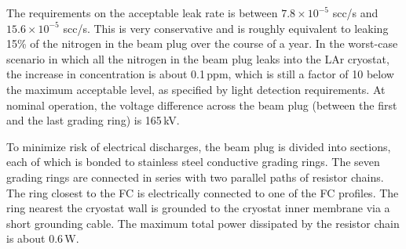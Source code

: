
The requirements on the acceptable leak rate is between $7.8\times 10^{-5}$ scc/s and $15.6\times 10^{-5}$ scc/s. This is very conservative and is roughly equivalent to leaking  15\% of the nitrogen in the beam plug over the course of a year.
  In the worst-case scenario in which all the nitrogen in the beam plug leaks into the LAr cryostat, the increase in concentration is about 0.1\,ppm, which is still a factor of 10 below the maximum acceptable level, as specified by light detection requirements.
  At nominal operation, the voltage difference across the beam plug (between the first and the last grading ring) is 165\,kV. 

    To minimize risk of electrical discharges, the beam plug is divided into sections, each of which is bonded to stainless steel conductive grading rings. The seven grading rings are connected in series with two parallel paths of resistor chains. The ring closest to the FC is electrically connected to one of the FC profiles. 
  The ring nearest the cryostat wall is grounded to the cryostat inner membrane via a short grounding cable. 
The maximum total power dissipated by the resistor chain is about 0.6\,W.


